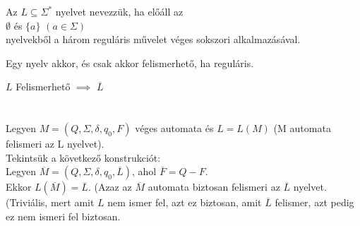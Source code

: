 \begin{frame}

\begin{tcolorbox}[title={Def.: Reguláris nyelv}]
Az $L \subseteq {\Sigma}^*$ nyelvet  nevezzük, ha előáll az\\
$\emptyset$ és $\{a\}$ $(a \in {\Sigma})$\\
nyelvekből a három reguláris művelet véges sokszori alkalmazásával.
\end{tcolorbox}

\begin{tcolorbox}[title={Tétel: Kleene tétel}]
Egy nyelv akkor, és csak akkor felismerhető, ha reguláris.
\end{tcolorbox}

\end{frame}

\begin{frame}
\begin{tcolorbox}[title={Tétel: Felismerhető nyelvek komplementere}]
$L$ Felismerhető $\implies$ $\overline{L}$\\
\tcblower
\msmallskip
\underline{}\\
\mmedskip
\\
Legyen $M = (Q, \Sigma , \delta , q_0, F)$ véges automata és $L = L(M)$ (M automata felismeri az L nyelvet).\\
Tekintsük a következő konstrukciót:\\
Legyen $\overline{M} = (Q, \Sigma , \delta, q_0, \overline{L})$, ahol $\overline{F} = Q - F$.\\
Ekkor  $L(\overline{M}) = \overline{L}$. (Azaz az $\overline{M}$ automata biztosan felismeri az $\overline{L}$ nyelvet.\\ 
(Triviális, mert amit $L$ nem ismer fel, azt ez biztosan, amit $\overline{L}$ felismer, azt pedig ez nem ismeri fel biztosan.

\end{tcolorbox}

\end{frame}

